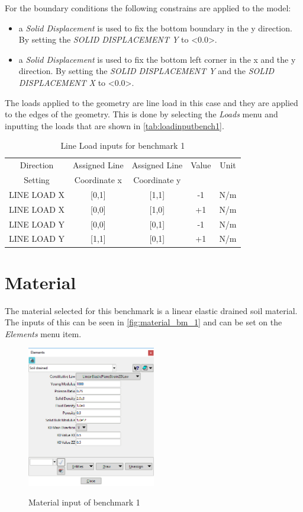 \documentclass{deltares_manual_style}
\begin{document}
For the boundary conditions the following constrains are applied to the model:
\begin{itemize}
	\item a \textit{Solid Displacement} is used to fix the bottom boundary in the y direction. By setting the \textit{SOLID DISPLACEMENT Y} to <0.0>.
	\item a \textit{Solid Displacement} is used to fix the bottom left corner in the x and the y direction. By setting
	the \textit{SOLID DISPLACEMENT Y} and the \textit{SOLID DISPLACEMENT X} to <0.0>.
\end{itemize}

The loads applied to the geometry are line load in this case and they are applied to the edges of the geometry. This is done by
selecting the \textit{Loads} menu and inputting the loads that are shown in \autoref{tab:loadinputbench1}.
\begin{table}[h]
	\caption{Line Load inputs for benchmark 1}
	\label{tab:loadinputbench1}
	\centering
		\begin{tabular}{|c|c|c|c|c|}
			\hline
			Direction  & Assigned Line  & Assigned Line  & Value  & Unit \\
			Setting & Coordinate x & Coordinate y & & \\ \hline
			LINE LOAD X & [0,1] & [1,1] & -1 & N/m \\ \hline
			LINE LOAD X & [0,0] & [1,0] & +1 & N/m \\ \hline
			LINE LOAD Y & [0,0] & [0,1] & -1 & N/m\\ \hline
			LINE LOAD Y & [1,1] & [0,1] & +1 & N/m \\ \hline
		\end{tabular}
\end{table}

\section{Material}
The material selected for this benchmark is a linear elastic drained soil material. The inputs of this can be seen in
\autoref{fig:material_bm_1} and can be set on the \textit{Elements} menu item.
\begin{figure}[H]
	\centering
		\includegraphics[width=0.5\textwidth]{figures/material_bm_1.png}
	\label{fig:material_bm_1}
	\caption{Material input of benchmark 1}
\end{figure}
\end{document}
